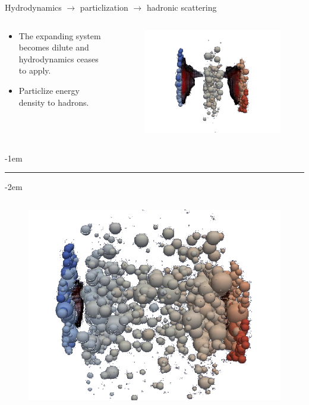 \documentclass[11pt]{beamer}
\begin{document}
\begin{frame}{Hydrodynamics $\rightarrow$ particlization $\rightarrow$ hadronic scattering}
\begin{columns}[onlytextwidth]
\begin{column}{0.85\textwidth}
  \begin{itemize}
  	\item The expanding system becomes dilute and hydrodynamics ceases to apply. 
  	\item Particlize energy density to hadrons.
  \end{itemize}
  \end{column}
  \begin{column}{0.2\textwidth}
    \begin{figure}
   	\begin{center}
   	\includegraphics[width=\textwidth]{pics/new230.png}
	\end{center} 	
  	\end{figure}
  \end{column}
\end{columns}
\kern-1em
\begin{center}
\rule{11cm}{0.5pt}
\end{center}
\kern-2em
\begin{columns}
 \begin{column}{0.15\textwidth}
    \begin{figure}
   	\begin{center}
   	\includegraphics[width=\textwidth]{pics/new300.png}

\end{center}
\end{figure}
\end{column}
\end{columns}
\end{frame}
\end{document}
